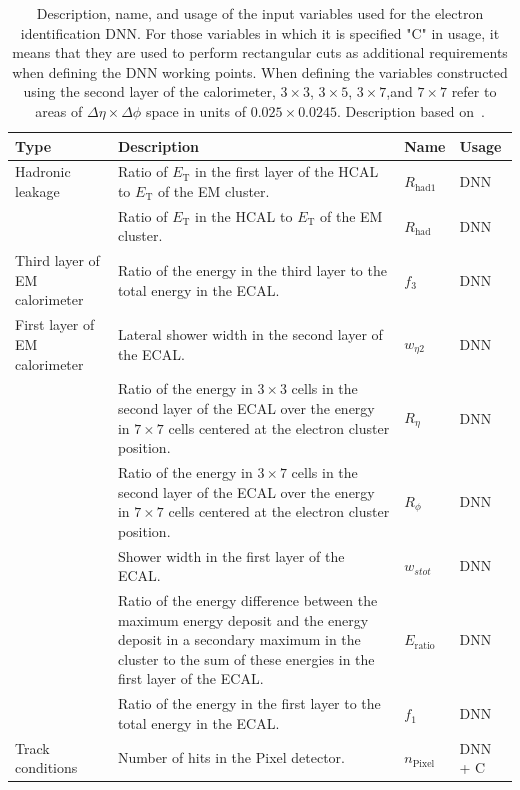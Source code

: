 {\scriptsize
\begin{longtable}{p{2.3cm}p{6.5cm}p{1.8cm}p{1.8cm}}
  \caption{Description, name, and usage of the input variables used for the electron identification DNN. For those variables in which it is specified "C" in usage, it means that they are used to perform rectangular cuts as additional requirements when defining the DNN working points. When defining the variables constructed using the second layer of the calorimeter, $3\times3$, $3\times5$, $3\times7$,and $7\times7$ refer to areas of $\Delta \eta \times \Delta \phi$ space in units of $0.025\times0.0245$. Description based on~\cite{dnn_paper}.}\\
  \toprule
  \textbf{Type} & \textbf{Description} & \textbf{Name} & \textbf{Usage} \\
  \midrule
  \endfirsthead
  \midrule
  \endhead
  Hadronic leakage & Ratio of $E_{\text{T}}$ in the first layer of the HCAL to $E_{\text{T}}$ of the EM cluster. & $R_{\text{had1}}$ & DNN \\
   & Ratio of $E_{\text{T}}$ in the HCAL to $E_{\text{T}}$ of the EM cluster. & $R_{\text{had}}$ & DNN \\
  \midrule
  Third layer of EM calorimeter & Ratio of the energy in the third layer to the total energy in the ECAL. & $f_3$ & DNN \\
  \midrule
  First layer of EM calorimeter & Lateral shower width in the second layer of the ECAL. & $w_{\eta2}$ & DNN \\
   & Ratio of the energy in $3{\times}3$ cells in the second layer of the ECAL over the energy in $7{\times}7$ cells centered at the electron cluster position. & $R_{\eta}$ & DNN \\
   & Ratio of the energy in $3{\times}7$ cells in the second layer of the ECAL over the energy in $7{\times}7$ cells centered at the electron cluster position. & $R_{\phi}$ & DNN \\
   & Shower width in the first layer of the ECAL. & $w_{stot}$ & DNN\\
   & Ratio of the energy difference between the maximum energy deposit and the energy deposit in a secondary maximum in the cluster to the sum of these energies in the first layer of the ECAL. & $E_{\text{ratio}}$ & DNN \\
   & Ratio of the energy in the first layer to the total energy in the ECAL. & $f_1$ & DNN \\
  \midrule
  Track conditions & Number of hits in the Pixel detector. & $n_{\text{Pixel}}$ & DNN + C \\

\end{longtable}}
